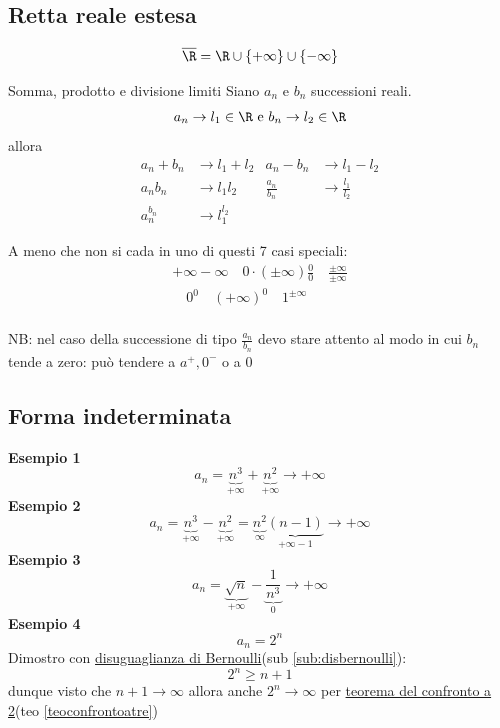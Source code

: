 \subsection{Retta reale estesa}
\label{sub:rettarealeestesa}
\[
	\overline{\R} = \R \cup \left\{ +\infty \right\} \cup \left\{ - \infty \right\}
\]
\begin{teorema}{Somma, prodotto e divisione limiti}
	Siano $a_n$ e $b_n$ successioni reali. \[
		a_n \to l_1 \in  \R \text{ e } b_n \to l_2 \in  \R
	\]
	allora
	\begin{align*}
		a_n + b_n & \to l_1 + l_2  & a_n - b_n       & \to l_1-l_2         \\
		a_n b_n   & \to l_1l_2     & \frac{a_n}{b_n} & \to \frac{l_1}{l_2} \\
		a_n^{b_n} & \to l_1^{ l_2}
	\end{align*}

	A meno che non si cada in uno di questi 7 casi speciali:
	\begin{gather*}
		+\infty - \infty \quad 0 \cdot \left( \pm \infty \right) \frac{0}{0} \quad  \frac{\pm \infty}{\pm \infty}\\
		\quad 0^{0} \quad \left( + \infty \right) ^{0} \quad 1^{\pm \infty}\\
	\end{gather*}

\end{teorema}
NB: nel caso della successione di tipo $\frac{a_n}{b_n}$ devo stare attento al modo in cui $b_n$ tende a zero: può tendere a $a^{+}, 0 ^{-}$ o a $0$

\subsection{Forma indeterminata}
\textbf{Esempio 1}
\[
	a_n = \underbrace{n^3}_{+ \infty} + \underbrace{n^2}_{+\infty} \to + \infty
\]
\textbf{Esempio 2}
\[
	a_n = \underbrace{n^3}_{+ \infty} -  \underbrace{n^2}_{+\infty} = \underbrace{n^2}_{\infty} \underbrace{\left( n-1 \right)}_{+\infty-1}  \to + \infty
\]
\textbf{Esempio 3}
\[
	a_n= \underbrace{\sqrt{n}}_{+\infty} - \underbrace{\frac{1}{n^3}}_{0} \to + \infty
\]
\textbf{Esempio 4}
\[
	a_n = 2^{n}
\]
Dimostro con \underline{disuguaglianza di Bernoulli}(sub \ref{sub:disbernoulli}):
\[
	2^{n} \ge n+1
\]
dunque visto che $ n+1 \to \infty$ allora anche $2^{n} \to \infty$ per \underline{teorema del confronto a 2}(teo \ref{teoconfrontoatre})

